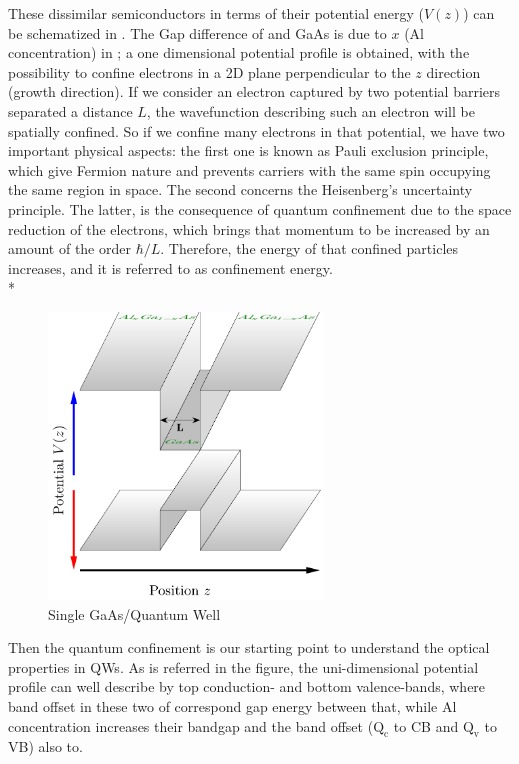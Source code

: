 These  dissimilar semiconductors in terms of their potential energy ($V(z)$) can be schematized in . The Gap difference of \algaas and GaAs is due to $x$ (Al concentration) in \algaas;  a one dimensional potential profile is obtained, with the possibility to confine electrons in a 2D plane perpendicular to the  $z$ direction (growth direction). 
If we consider an electron captured by two potential barriers separated a distance $L$, the wavefunction describing such an electron will be spatially confined.
So if we confine many electrons in that potential,  we have two important physical aspects: the first one is known as Pauli exclusion principle, which give Fermion nature and prevents carriers with the same spin occupying the same region in  space\cite{harrison2016quantum,pauli1925zusammenhang}. The second  concerns the Heisenberg's uncertainty principle. 
The latter, is the consequence of quantum confinement due to the space reduction of the electrons, which brings that momentum to be increased by an amount of the order $\hbar/L$. Therefore, the energy of that confined particles increases, and it is referred to as confinement energy\cite{cardona2005fundamentals}. \\*
\begin{figure}
	\centering
	\includegraphics[width=0.65\textwidth]{../figures/chapter-1/heterostructures/out/qw1}
	\caption{Single GaAs/\algaas Quantum Well }
	\label{fig:subsection-1.2-single-quantum-well-scheme}
\end{figure}
Then the quantum confinement is our starting point to understand the optical properties in \gls{QW}s. As is referred in the figure, the uni-dimensional potential profile can well describe by top conduction- and bottom valence-bands, where band offset in these two of correspond gap energy between that, while Al concentration increases their bandgap and the band offset ($\mathrm{Q_{c}}$ to \gls{CB} and $\mathrm{Q_{v}}$ to \gls{VB}) also to.   

